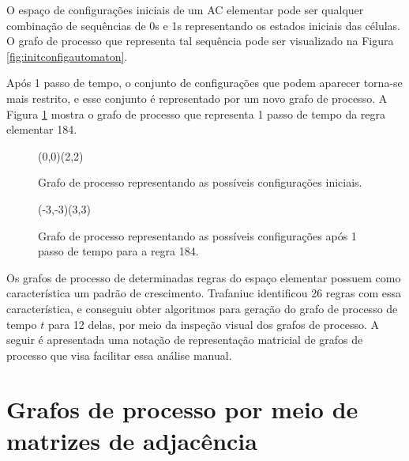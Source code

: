 \documentclass[a4,11pt]{article}
\begin{document}
O espaço de configurações iniciais de um AC
elementar pode ser qualquer combinação de sequências de 0s e 1s
representando os estados iniciais das células. O grafo de processo
que representa tal sequência pode ser visualizado na Figura
\ref{fig:initconfigautomaton}.

Após 1 passo de tempo, o conjunto de configurações que podem aparecer
torna-se mais restrito, e esse conjunto é representado por um novo grafo
de processo. A Figura \ref{fig:r184step1} mostra o grafo de processo que
representa 1 passo de tempo da regra elementar 184.

\begin{figure}[htp]
\begin{minipage}[b]{0.5\linewidth}
\centering
\begin{VCPicture}{(0,0)(2,2)}
\end{VCPicture}
\caption{Grafo de processo representando as possíveis configurações
iniciais.}
\label{fig:initconfigautomaton}
\end{minipage}
\hspace{0.5cm}
\begin{minipage}[b]{0.5\linewidth}
\centering
\begin{VCPicture}{(-3,-3)(3,3)}
 
 
 
 
 
\end{VCPicture}
\caption{Grafo de processo representando as possíveis configurações
após 1 passo de tempo para a regra 184.}
\label{fig:r184step1}
\end{minipage}
\end{figure}

Os grafos de processo de determinadas regras do espaço elementar possuem como
característica um padrão de crescimento. Trafaniuc \cite{trafaniuc2004}
identificou 26 regras com essa característica, e conseguiu obter algoritmos
para geração do grafo de processo de tempo $t$ para 12 delas, por meio da
inspeção visual dos grafos de processo. A seguir é apresentada uma notação
de representação matricial de grafos de processo que visa facilitar essa
análise manual.

\section{Grafos de processo por meio de matrizes de adjacência}\label{sec:matrix}
\end{document}
